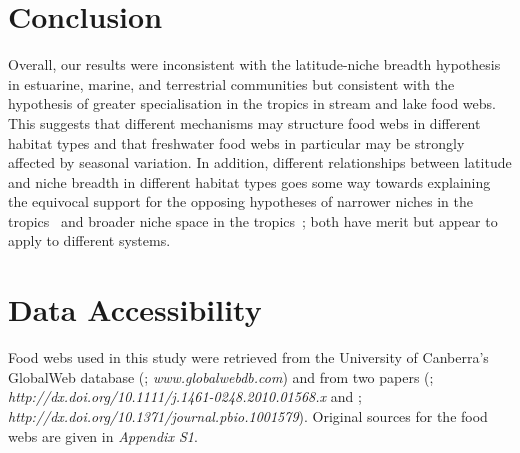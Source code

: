 \documentclass[12pt]{article}
\begin{document}


\section*{Conclusion}

  Overall, our results were inconsistent with the latitude-niche breadth
  hypothesis in estuarine, marine, and terrestrial communities but consistent
  with the hypothesis of greater specialisation in the tropics in stream and
  lake food webs. This suggests that different mechanisms may structure food
  webs in different habitat types and that freshwater food webs in particular
  may be strongly affected by seasonal variation. In addition, different
  relationships between latitude and niche breadth in different habitat types
  goes some way towards explaining the equivocal support for the opposing
  hypotheses of narrower niches in the tropics~\cite{Vazquez2004} and broader
  niche space in the tropics~\cite{Davies2007}; both have merit but appear to
  apply to different systems.

\section*{Data Accessibility}

  Food webs used in this study were retrieved from the University of Canberra's 
  GlobalWeb database (\cite{GlobalWeb}; \emph{www.globalwebdb.com}) and from
  two papers (\cite{Riede2011}; \emph{http://dx.doi.org/10.1111/j.1461-0248.2010.01568.x}
  and \cite{Dunne2013}; \emph{http://dx.doi.org/10.1371/journal.pbio.1001579}). Original sources for the
  food webs are given in \emph{Appendix S1}.
\end{document}
